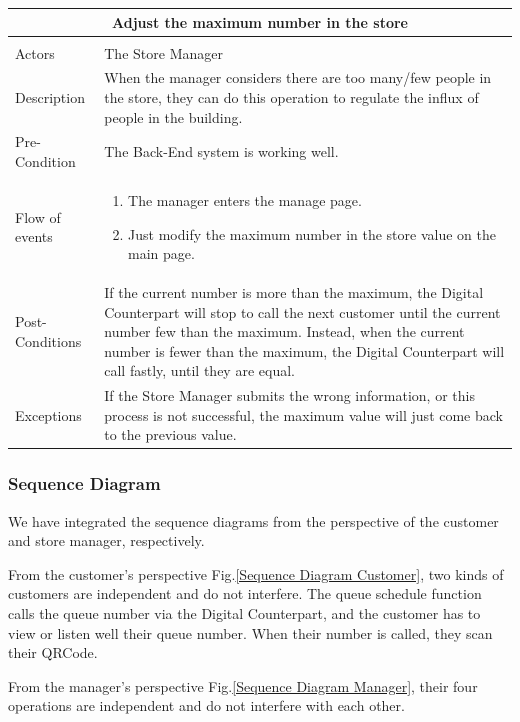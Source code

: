\documentclass[a4paper,12pt]{report}
\begin{document}
\begin{center}
	\begin{tabular}{p{}|p{}}
		\multicolumn{2}{c}{\large \textbf{Adjust the maximum number in the store}} \\[3mm] 
		\hline \\
		Actors & The Store Manager  \\[3mm] 
		Description & When the manager considers there are too many/few people in the store, they can do this operation to regulate the influx of people in the building.
		\\[3mm]  
		Pre-Condition & The Back-End system is working well. \\[3mm] 
		Flow of events & 
		\begin{enumerate}
			\item The manager enters the manage page.
			\item Just modify the maximum number in the store value on the main page.
		\end{enumerate}
		\\[3mm] 
		Post-Conditions & If the current number is more than the maximum, the Digital Counterpart will stop to call the next customer until the current number few than the maximum. Instead, when the current number is fewer than the maximum, the Digital Counterpart will call fastly, until they are equal.
		\\[3mm] 
		Exceptions & If the Store Manager submits the wrong information, or this process is not successful, the maximum value will just come back to the previous value. \\[3mm] 
	\end{tabular}
\end{center}

\subsubsection{Sequence Diagram}
We have integrated the sequence diagrams from the perspective of the customer and store manager, respectively.

From the customer's perspective Fig.\ref{Sequence Diagram Customer}, two kinds of customers are independent and do not interfere. The queue schedule function calls the queue number via the Digital Counterpart, and the customer has to view or listen well their queue number. When their number is called, they scan their QRCode.

From the manager's perspective Fig.\ref{Sequence Diagram Manager}, their four operations are independent and do not interfere with each other.
\end{document}
